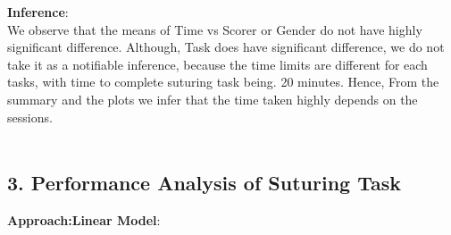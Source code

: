 \documentclass[12pt,epsf]{report}
\begin{document}
\textbf{Inference}:\\
We observe that the means of Time vs Scorer or Gender do not have highly significant difference. Although, Task does have significant difference, we do not take it as a notifiable inference, because the time limits are different for each tasks, with time to complete suturing task being. 20 minutes. Hence, From the summary and the plots we infer that the time taken highly depends on the sessions.\\
\\
\FloatBarrier
\subsection*{3. Performance Analysis of Suturing Task}
\textbf{Approach:Linear Model}:\\
\end{document}
